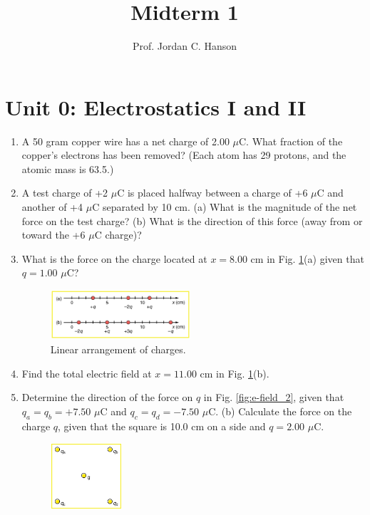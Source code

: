 \documentclass[12pt,twocolumn]{article}
\title{Midterm 1}
\author{Prof. Jordan C. Hanson}
\begin{document}
\maketitle

\section{Unit 0: Electrostatics I and II}

\noindent
\begin{enumerate}
\item A 50 gram copper wire has a net charge of 2.00 $\mu$C. What fraction of the copper’s electrons has been removed? (Each atom has 29 protons, and the atomic mass is 63.5.) \\ \vspace{2cm}
\item A test charge of +2 $\mu$C is placed halfway between a charge of +6 $\mu$C and another of +4 $\mu$C separated by 10 cm. (a) What is the magnitude of the net force on the test charge? (b) What is the direction of this force (away from or toward the +6 $\mu$C charge)? \\ \vspace{3cm}
\item What is the force on the charge located at $x=8.00$ cm in Fig. \ref{fig:e-field_1}(a) given that $q=1.00$ $\mu$C?
\begin{figure}[hb]
\centering
\includegraphics[width=0.49\textwidth]{e-field_1.jpeg}
\caption{\label{fig:e-field_1} Linear arrangement of charges.}
\end{figure}
\item Find the total electric field at $x=11.00$ cm in Fig. \ref{fig:e-field_1}(b). \\ \vspace{5cm}
\item Determine the direction of the force on $q$ in Fig. \ref{fig:e-field_2}, given that $q_a=q_b=+7.50$ $\mu$C and $q_c = q_d = -7.50$ $\mu$C. (b) Calculate the force on the charge $q$, given that the square is 10.0 cm on a side and $q=2.00$ $\mu$C.
\begin{figure}[hb]
\centering
\includegraphics[width=0.25\textwidth]{e-field_2.jpeg}

\end{figure}
\end{enumerate}
\end{document}
